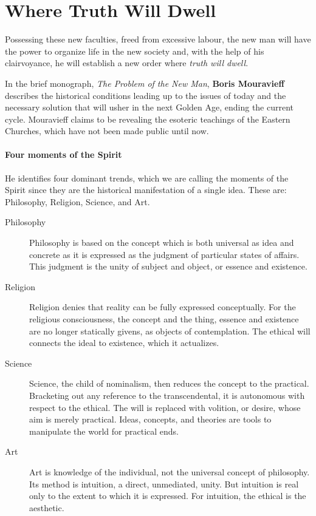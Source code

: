 \section{Where Truth Will Dwell}

\begin{quotex}
Possessing these new faculties, freed from excessive labour, the new man will have the power to organize life in the new society and, with the help of his clairvoyance, he will establish a new order where \emph{truth will dwell}.

\end{quotex}
In the brief monograph, \emph{The Problem of the New Man}, \textbf{Boris Mouravieff} describes the historical conditions leading up to the issues of today and the necessary solution that will usher in the next Golden Age, ending the current cycle. Mouravieff claims to be revealing the esoteric teachings of the Eastern Churches, which have not been made public until now.

\paragraph{Four moments of the Spirit}
He identifies four dominant trends, which we are calling the moments of the Spirit since they are the historical manifestation of a single idea. These are: Philosophy, Religion, Science, and Art.

\begin{description}
\item[Philosophy ] Philosophy is based on the concept which is both universal as idea and concrete as it is expressed as the judgment of particular states of affairs. This judgment is the unity of subject and object, or essence and existence. 

\item[Religion ] Religion denies that reality can be fully expressed conceptually. For the religious consciousness, the concept and the thing, essence and existence are no longer statically givens, as objects of contemplation. The ethical will connects the ideal to existence, which it actualizes. 

\item[Science ] Science, the child of nominalism, then reduces the concept to the practical. Bracketing out any reference to the transcendental, it is autonomous with respect to the ethical. The will is replaced with volition, or desire, whose aim is merely practical. Ideas, concepts, and theories are tools to manipulate the world for practical ends. 

\item[Art ] Art is knowledge of the individual, not the universal concept of philosophy. Its method is intuition, a direct, unmediated, unity. But intuition is real only to the extent to which it is expressed. For intuition, the ethical is the aesthetic. 

\end{description}
